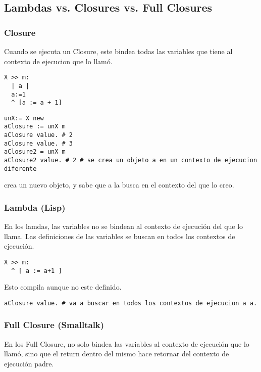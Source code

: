 
\subsection{Lambdas vs. Closures vs. Full Closures}

\subsubsection{Closure}

Cuando se ejecuta un Closure, este bindea todas las variables que tiene al contexto de ejecucion que lo llamó. 

\begin{verbatim}
X >> m:
  | a |
  a:=1 
  ^ [a := a + 1]
\end{verbatim}

\begin{verbatim}
unX:= X new
aClosure := unX m
aClosure value. # 2
aClosure value. # 3
aClosure2 = unX m
aClosure2 value. # 2 # se crea un objeto a en un contexto de ejecucion diferente
\end{verbatim}

\code{[ .. ]} crea un nuevo objeto, y sabe que a  la busca en el contexto del que lo creo. 

\subsubsection{Lambda (Lisp)}

En los lamdas, las variables no se bindean al contexto de ejecuci\'on del que lo llama. Las definiciones de las variables se buscan en todos los contextos de ejecuci\'on. 

\begin{verbatim}
X >> m: 
  ^ [ a := a+1 ]
\end{verbatim}

Esto compila aunque  no este definido. 

\begin{verbatim}
aClosure value. # va a buscar en todos los contextos de ejecucion a a.
\end{verbatim}

\subsubsection{Full Closure (Smalltalk)}


En los Full Closure, no solo bindea las variables al contexto de ejecución que lo llamó, sino que el return dentro del mismo hace retornar del contexto de ejecución padre. 

